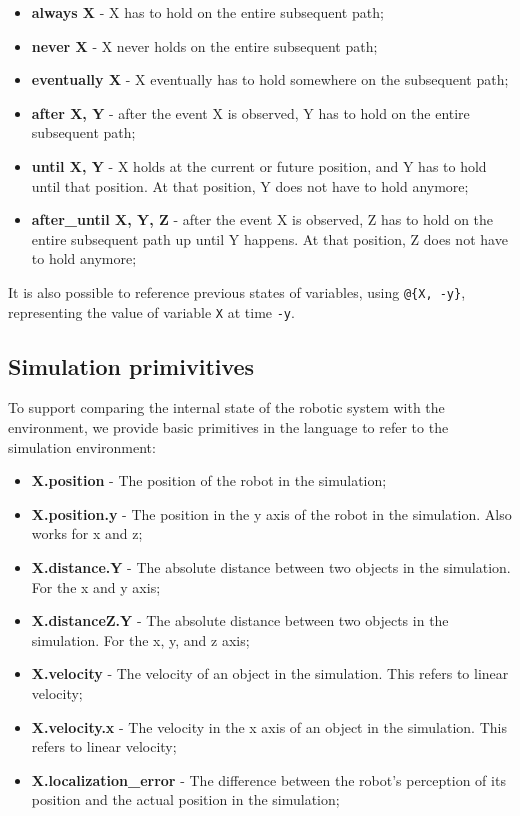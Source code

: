 \documentclass[runningheads]{llncs}
\begin{document}
\begin{itemize}
\item {\bfseries always X} - X has to hold on the entire subsequent path;
\item {\bfseries never X} - X never holds on the entire subsequent path;
\item {\bfseries eventually X} - X eventually has to hold somewhere on the subsequent path;
\item {\bfseries after X, Y} - after the event X is observed, Y has to hold on the entire subsequent path;
\item {\bfseries until X, Y} - X holds at the current or future position, and Y has to hold until that position. At that position, Y does not have to hold anymore;
\item {\bfseries after\_until X, Y, Z} - after the event X is observed, Z has to hold on the entire subsequent path up until Y happens. At that position, Z does not have to hold anymore;
\end{itemize}

\noindent It is also possible to reference previous states of variables, using \lstinline|@{X, -y}|, representing the value of variable \lstinline|X| at time \lstinline|-y|.

\subsection{Simulation primivitives}

To support comparing the internal state of the robotic system with the environment, we provide basic primitives in the language to refer to the simulation environment:

\begin{itemize}
\item {\bfseries X.position} - The position of the robot in the simulation;
\item {\bfseries X.position.y} - The position in the y axis of the robot in the simulation. Also works for x and z;
\item {\bfseries X.distance.Y} - The absolute distance between two objects in the simulation. For the x and y axis;
\item {\bfseries X.distanceZ.Y} - The absolute distance between two objects in the simulation. For the x, y, and z axis;
\item {\bfseries X.velocity} - The velocity of an object in the simulation. This refers to linear velocity;
\item {\bfseries X.velocity.x} - The velocity in the x axis of an object in the simulation. This refers to linear velocity;
\item {\bfseries X.localization\_error} - The difference between the robot's perception of its position and the actual position in the simulation;
\end{itemize}
\end{document}
